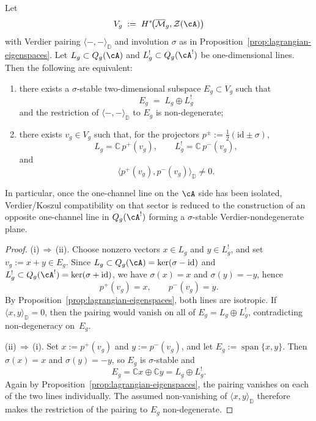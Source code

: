 \begin{proposition}\label{prop:one-channel-verdier-criterion}
Let
\[
V_g \;:=\; H^*\!\bigl(\overline{\mathcal{M}}_g, \mathcal{Z}(\cA)\bigr)
\]
with Verdier pairing $\langle-,-\rangle_{\mathbb{D}}$ and involution
$\sigma$ as in Proposition~\ref{prop:lagrangian-eigenspaces}.  Let
$L_g \subset Q_g(\cA)$ and $L_g^! \subset Q_g(\cA^!)$ be
one-dimensional lines.
Then the following are equivalent:
\begin{enumerate}[label=\textup{(\roman*)}]
\item there exists a $\sigma$-stable two-dimensional subspace
  $E_g \subset V_g$ such that
  \[
  E_g \;=\; L_g \oplus L_g^!
  \]
  and the restriction of $\langle-,-\rangle_{\mathbb{D}}$ to $E_g$ is
  non-degenerate;
\item there exists $v_g \in V_g$ such that, for the projectors
  $p^\pm := \tfrac12(\mathrm{id}\pm\sigma)$,
  \[
  L_g = \mathbb{C}\,p^+(v_g), \qquad
  L_g^! = \mathbb{C}\,p^-(v_g),
  \]
  and
  \[
  \bigl\langle p^+(v_g), p^-(v_g)\bigr\rangle_{\mathbb{D}} \neq 0.
  \]
\end{enumerate}
In particular, once the one-channel line on the $\cA$ side has been
isolated, Verdier/Koszul compatibility on that sector is reduced to the
construction of an opposite one-channel line in $Q_g(\cA^!)$ forming a
$\sigma$-stable Verdier-nondegenerate plane.
\end{proposition}

\begin{proof}
\textup{(i)}\,$\Rightarrow$\,\textup{(ii)}.
Choose nonzero vectors $x \in L_g$ and $y \in L_g^!$, and set
$v_g := x+y \in E_g$.
Since $L_g \subset Q_g(\cA)=\ker(\sigma-\mathrm{id})$ and
$L_g^! \subset Q_g(\cA^!)=\ker(\sigma+\mathrm{id})$, we have
$\sigma(x)=x$ and $\sigma(y)=-y$, hence
\[
p^+(v_g)=x, \qquad p^-(v_g)=y.
\]
By Proposition~\ref{prop:lagrangian-eigenspaces}, both lines are
isotropic.  If $\langle x,y\rangle_{\mathbb{D}}=0$, then the pairing
would vanish on all of $E_g=L_g\oplus L_g^!$, contradicting
non-degeneracy on~$E_g$.

\textup{(ii)}\,$\Rightarrow$\,\textup{(i)}.
Set $x:=p^+(v_g)$ and $y:=p^-(v_g)$, and let
$E_g := \operatorname{span}\{x,y\}$.
Then $\sigma(x)=x$ and $\sigma(y)=-y$, so $E_g$ is $\sigma$-stable and
\[
E_g = \mathbb{C}x \oplus \mathbb{C}y = L_g \oplus L_g^!.
\]
Again by Proposition~\ref{prop:lagrangian-eigenspaces}, the pairing
vanishes on each of the two lines individually.  The assumed
non-vanishing of $\langle x,y\rangle_{\mathbb{D}}$ therefore makes the
restriction of the pairing to $E_g$ non-degenerate.
\end{proof}

